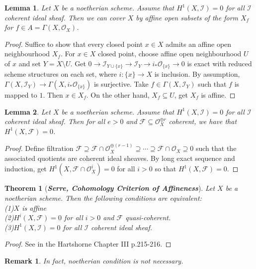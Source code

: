 \documentclass{ctexart}
\newtheorem{remark}{Remark}[section]
\newtheorem{theorem}{Theorem}[section]
\newtheorem{lemma}{Lemma}[section]
\begin{document}
\begin{lemma}
    Let $X$ be a noetherian scheme.
    Assume that $H^{1}(X, \mathcal{I}) = 0$ for all $\mathcal{I}$ coherent ideal sheaf.
    Then we can cover $X$ by affine open subsets of the form $X_{f}$ for $f\in A = \Gamma(X, \mathcal{O}_{X})$.
    \vspace{-\baselineskip} %
    \label{Lemma 2.3}
\end{lemma}
\begin{proof}
    Suffice to show that every closed point $x\in X$ admits an affine open neighbourhood $X_{f}$.
    For $x\in X$ closed point, choose affine open neighbourhood $U$ of $x$ and set $Y = X \setminus U$.
    Get $0 \longrightarrow \mathcal{I}_{Y \cup \{x\}} \longrightarrow \mathcal{I}_{Y} \longrightarrow i_{\ast}\mathcal{O}_{\{x\}} \longrightarrow 0$  is exact with reduced scheme structures on each set,
    where $i: \{x\} \longrightarrow X$ is inclusion.
    By assumption, $\Gamma(X, \mathcal{I}_{Y}) \longrightarrow \Gamma(X, i_{\ast}\mathcal{O}_{\{x\}})$ is surjective.
    Take $f\in \Gamma(X, \mathcal{I}_{Y})$ such that $f$ is mapped to $1$.
    Then $x\in X_{f}$.
    On the other hand, $X_{f} \subseteq U$, get $X_{f}$ is affine.
\end{proof}
\begin{lemma}
    Let $X$ be a noetherian scheme.
    Assume that $H^{1}(X, \mathcal{I}) = 0$ for all $\mathcal{I}$ coherent ideal sheaf.
    Then for all $e > 0$ and $\mathcal{F} \subseteq \mathcal{O}_{X}^{\oplus r}$ coherent, we have that $H^{1}(X, \mathcal{F}) = 0$.
    \label{Lemma 2.4}
\end{lemma}
\begin{proof}
    Define filtration $\mathcal{F} \supseteq \mathcal{F} \cap \mathcal{O}_{X}^{\oplus (r - 1)} \supseteq \cdots \supseteq \mathcal{F} \cap \mathcal{O}_{X} \supseteq 0$ such that the associated quotients are coherent ideal sheaves.
    By long exact sequence and induction, get $H^{1}(X, \mathcal{F} \cap \mathcal{O}_{X}^{i}) = 0$ for all $i > 0$ so that $H^{1}(X, \mathcal{F}) = 0$.
\end{proof}
\begin{theorem}[\textbf{\emph{Serre, Cohomology Criterion of Affineness}}]
    Let $X$ be a noetherian scheme.
    Then the following conditions are equivalent: \\
    (1)$X$ is affine \\
    (2)$H^{i}(X, \mathcal{F}) = 0$ for all $i > 0$ and $\mathcal{F}$ quasi-coherent. \\
    (3)$H^{1}(X, \mathcal{I}) = 0$ for all $\mathcal{I}$ coherent ideal sheaf.
    \label{Theorem 2.4}
\end{theorem}
\begin{proof}
    See in the Hartshorne Chapter III p.215-216.
\end{proof}
\begin{remark}
    In fact, noetherian condition is not necessary.
\end{remark}
\end{document}
